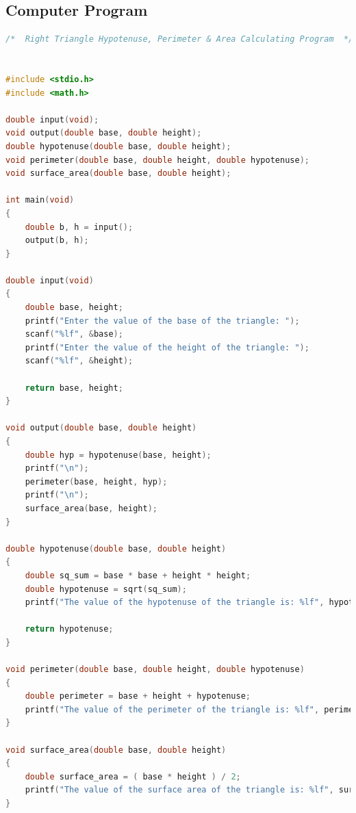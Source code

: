 		\subsection{{Computer Program}}
	
			\begin{lstlisting}[language=C, caption=\textit{Right Triangle Hypotenuse, Perimeter \& Area Calculating Program}]	
/*  Right Triangle Hypotenuse, Perimeter & Area Calculating Program  */


#include <stdio.h>
#include <math.h>

double input(void);
void output(double base, double height);
double hypotenuse(double base, double height);
void perimeter(double base, double height, double hypotenuse);
void surface_area(double base, double height);

int main(void)
{
    double b, h = input();
    output(b, h);
}

double input(void)
{
    double base, height;
    printf("Enter the value of the base of the triangle: ");
    scanf("%lf", &base);
    printf("Enter the value of the height of the triangle: ");
    scanf("%lf", &height);
    
    return base, height;
}

void output(double base, double height)
{
    double hyp = hypotenuse(base, height);
    printf("\n");
    perimeter(base, height, hyp);
    printf("\n");
    surface_area(base, height);
}

double hypotenuse(double base, double height)
{
    double sq_sum = base * base + height * height;
    double hypotenuse = sqrt(sq_sum);
    printf("The value of the hypotenuse of the triangle is: %lf", hypotenuse);

    return hypotenuse;
}

void perimeter(double base, double height, double hypotenuse)
{
    double perimeter = base + height + hypotenuse;
    printf("The value of the perimeter of the triangle is: %lf", perimeter);
}

void surface_area(double base, double height)
{
    double surface_area = ( base * height ) / 2;
    printf("The value of the surface area of the triangle is: %lf", surface_area);
}


		\end{lstlisting}
